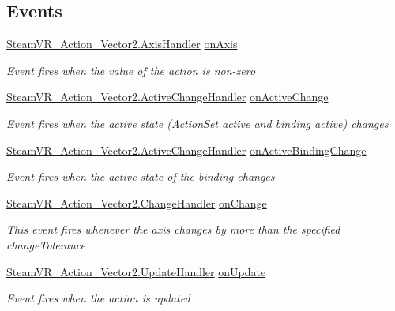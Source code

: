 \subsection*{Events}
\begin{DoxyCompactItemize}
\item 
\mbox{\hyperlink{class_valve_1_1_v_r_1_1_steam_v_r___action___vector2_a11d8b99df804d185a33c7c60791ef426}{Steam\+V\+R\+\_\+\+Action\+\_\+\+Vector2.\+Axis\+Handler}} \mbox{\hyperlink{class_valve_1_1_v_r_1_1_steam_v_r___action___vector2___source_a629cea5168ed40fdbe22da1288178f81}{on\+Axis}}
\begin{DoxyCompactList}\small\item\em Event fires when the value of the action is non-\/zero \end{DoxyCompactList}\item 
\mbox{\hyperlink{class_valve_1_1_v_r_1_1_steam_v_r___action___vector2_ad01c83284de71c0d9cd8f7e673ce5ab5}{Steam\+V\+R\+\_\+\+Action\+\_\+\+Vector2.\+Active\+Change\+Handler}} \mbox{\hyperlink{class_valve_1_1_v_r_1_1_steam_v_r___action___vector2___source_a142aa3f31f7934e26694858fdbfb927e}{on\+Active\+Change}}
\begin{DoxyCompactList}\small\item\em Event fires when the active state (Action\+Set active and binding active) changes \end{DoxyCompactList}\item 
\mbox{\hyperlink{class_valve_1_1_v_r_1_1_steam_v_r___action___vector2_ad01c83284de71c0d9cd8f7e673ce5ab5}{Steam\+V\+R\+\_\+\+Action\+\_\+\+Vector2.\+Active\+Change\+Handler}} \mbox{\hyperlink{class_valve_1_1_v_r_1_1_steam_v_r___action___vector2___source_a677e3fd6c4b5d1bcc300a9da605358e3}{on\+Active\+Binding\+Change}}
\begin{DoxyCompactList}\small\item\em Event fires when the active state of the binding changes \end{DoxyCompactList}\item 
\mbox{\hyperlink{class_valve_1_1_v_r_1_1_steam_v_r___action___vector2_ad390de62736aedd5be93238b1840ffec}{Steam\+V\+R\+\_\+\+Action\+\_\+\+Vector2.\+Change\+Handler}} \mbox{\hyperlink{class_valve_1_1_v_r_1_1_steam_v_r___action___vector2___source_a6bc09c8981144653425cee8720375ee3}{on\+Change}}
\begin{DoxyCompactList}\small\item\em This event fires whenever the axis changes by more than the specified change\+Tolerance \end{DoxyCompactList}\item 
\mbox{\hyperlink{class_valve_1_1_v_r_1_1_steam_v_r___action___vector2_a3f6872fd8960cbb9f571b0362857d9b5}{Steam\+V\+R\+\_\+\+Action\+\_\+\+Vector2.\+Update\+Handler}} \mbox{\hyperlink{class_valve_1_1_v_r_1_1_steam_v_r___action___vector2___source_acf147220613d53f51ed3184c5a4dceef}{on\+Update}}
\begin{DoxyCompactList}\small\item\em Event fires when the action is updated \end{DoxyCompactList}\end{DoxyCompactItemize}
